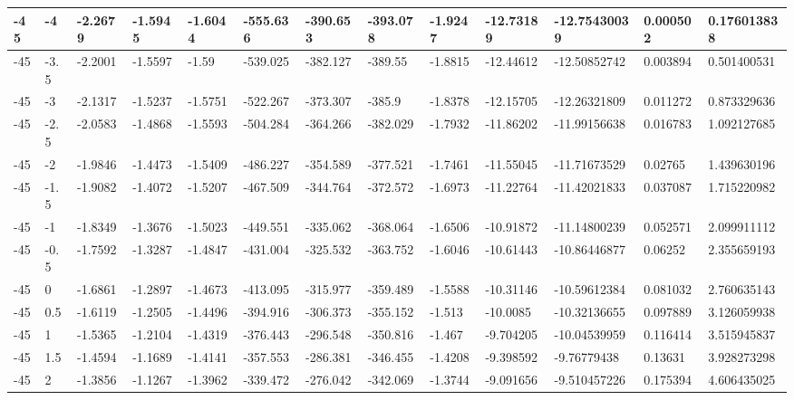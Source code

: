 \begin{longtable}{|l|l|l|l|l|l|l|l|l|l|l|l|l|}
-45   & -4    & -2.2679 & -1.5945 & -1.6044 & -555.636 & -390.653 & -393.078 & -1.9247  & -12.73189   & -12.75430039   & 0.000502                 & 0.176013838 \\ \hline
-45   & -3.5  & -2.2001 & -1.5597 & -1.59   & -539.025 & -382.127 & -389.55  & -1.8815  & -12.44612   & -12.50852742   & 0.003894                 & 0.501400531 \\ \hline
-45   & -3    & -2.1317 & -1.5237 & -1.5751 & -522.267 & -373.307 & -385.9   & -1.8378  & -12.15705   & -12.26321809   & 0.011272                 & 0.873329636 \\ \hline
-45   & -2.5  & -2.0583 & -1.4868 & -1.5593 & -504.284 & -364.266 & -382.029 & -1.7932  & -11.86202   & -11.99156638   & 0.016783                 & 1.092127685 \\ \hline
-45   & -2    & -1.9846 & -1.4473 & -1.5409 & -486.227 & -354.589 & -377.521 & -1.7461  & -11.55045   & -11.71673529   & 0.02765                  & 1.439630196 \\ \hline
-45   & -1.5  & -1.9082 & -1.4072 & -1.5207 & -467.509 & -344.764 & -372.572 & -1.6973  & -11.22764   & -11.42021833   & 0.037087                 & 1.715220982 \\ \hline
-45   & -1    & -1.8349 & -1.3676 & -1.5023 & -449.551 & -335.062 & -368.064 & -1.6506  & -10.91872   & -11.14800239   & 0.052571                 & 2.099911112 \\ \hline
-45   & -0.5  & -1.7592 & -1.3287 & -1.4847 & -431.004 & -325.532 & -363.752 & -1.6046  & -10.61443   & -10.86446877   & 0.06252                  & 2.355659193 \\ \hline
-45   & 0     & -1.6861 & -1.2897 & -1.4673 & -413.095 & -315.977 & -359.489 & -1.5588  & -10.31146   & -10.59612384   & 0.081032                 & 2.760635143 \\ \hline
-45   & 0.5   & -1.6119 & -1.2505 & -1.4496 & -394.916 & -306.373 & -355.152 & -1.513   & -10.0085    & -10.32136655   & 0.097889                 & 3.126059938 \\ \hline
-45   & 1     & -1.5365 & -1.2104 & -1.4319 & -376.443 & -296.548 & -350.816 & -1.467   & -9.704205   & -10.04539959   & 0.116414                 & 3.515945837 \\ \hline
-45   & 1.5   & -1.4594 & -1.1689 & -1.4141 & -357.553 & -286.381 & -346.455 & -1.4208  & -9.398592   & -9.76779438    & 0.13631                  & 3.928273298 \\ \hline
-45   & 2     & -1.3856 & -1.1267 & -1.3962 & -339.472 & -276.042 & -342.069 & -1.3744  & -9.091656   & -9.510457226   & 0.175394                 & 4.606435025 \\ \hline

\end{longtable}

